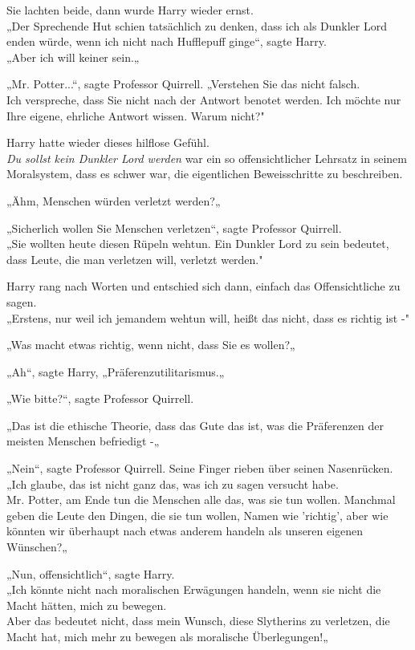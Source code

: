 {Sie lachten beide, dann wurde Harry wieder ernst.\\ „Der Sprechende Hut schien tatsächlich zu denken, dass ich als Dunkler Lord enden würde, wenn ich nicht nach Hufflepuff ginge“, sagte Harry.\\ „Aber ich will keiner sein.„

„Mr. Potter...“, sagte Professor Quirrell. „Verstehen Sie das nicht falsch.\\ Ich verspreche, dass Sie nicht nach der Antwort benotet werden. Ich möchte nur Ihre eigene, ehrliche Antwort wissen. Warum nicht?"

Harry hatte wieder dieses hilflose Gefühl.\\ \emph{Du sollst kein Dunkler Lord werden} war ein so offensichtlicher Lehrsatz in seinem Moralsystem, dass es schwer war, die eigentlichen Beweisschritte zu beschreiben.

„Ähm, Menschen würden verletzt werden?„

„Sicherlich wollen Sie Menschen verletzen“, sagte Professor Quirrell.\\ „Sie wollten heute diesen Rüpeln wehtun. Ein Dunkler Lord zu sein bedeutet, dass Leute, die man verletzen will, verletzt werden."

Harry rang nach Worten und entschied sich dann, einfach das Offensichtliche zu sagen.\\ „Erstens, nur weil ich jemandem wehtun will, heißt das nicht, dass es richtig ist -"

„Was macht etwas richtig, wenn nicht, dass Sie es wollen?„

„Ah“, sagte Harry, „Präferenzutilitarismus.„

„Wie bitte?“, sagte Professor Quirrell.

„Das ist die ethische Theorie, dass das Gute das ist, was die Präferenzen der meisten Menschen befriedigt -„

„Nein“, sagte Professor Quirrell. Seine Finger rieben über seinen Nasenrücken.\\ „Ich glaube, das ist nicht ganz das, was ich zu sagen versucht habe.\\ Mr. Potter, am Ende tun die Menschen alle das, was sie tun wollen. Manchmal geben die Leute den Dingen, die sie tun wollen, Namen wie 'richtig', aber wie könnten wir überhaupt nach etwas anderem handeln als unseren eigenen Wünschen?„

„Nun, offensichtlich“, sagte Harry.\\ „Ich könnte nicht nach moralischen Erwägungen handeln, wenn sie nicht die Macht hätten, mich zu bewegen.\\ Aber das bedeutet nicht, dass mein Wunsch, diese Slytherins zu verletzen, die Macht hat, mich mehr zu bewegen als moralische Überlegungen!„

}
